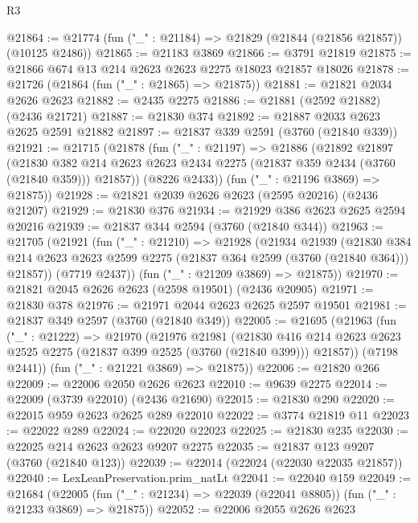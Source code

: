 \begin{lexlean}{R3}
\begin{coremodule}
@21864 := @21774 (fun ("_" : @21184) => @21829 (@21844 (@21856 @21857)) (@10125 @2486))
@21865 := @21183 @3869
@21866 := @3791 @21819
@21875 := @21866 @674 @13 @214 @2623 @2623 @2275 @18023 @21857 @18026
@21878 := @21726 (@21864 (fun ("_" : @21865) => @21875))
@21881 := @21821 @2034 @2626 @2623
@21882 := @2435 @2275
@21886 := @21881 (@2592 @21882) (@2436 @21721)
@21887 := @21830 @374
@21892 := @21887 @2033 @2623 @2625 @2591 @21882
@21897 := @21837 @339 @2591 (@3760 (@21840 @339))
@21921 := @21715
    (@21878
      (fun ("_" : @21197) =>
      @21886
        (@21892
          @21897
          (@21830
            @382
            @214
            @2623
            @2623
            @2434
            @2275
            (@21837 @359 @2434 (@3760 (@21840 @359)))
            @21857))
        (@8226 @2433))
      (fun ("_" : @21196 @3869) => @21875))
@21928 := @21821 @2039 @2626 @2623 (@2595 @20216) (@2436 @21207)
@21929 := @21830 @376
@21934 := @21929 @386 @2623 @2625 @2594 @20216
@21939 := @21837 @344 @2594 (@3760 (@21840 @344))
@21963 := @21705
    (@21921
      (fun ("_" : @21210) =>
      @21928
        (@21934
          @21939
          (@21830
            @384
            @214
            @2623
            @2623
            @2599
            @2275
            (@21837 @364 @2599 (@3760 (@21840 @364)))
            @21857))
        (@7719 @2437))
      (fun ("_" : @21209 @3869) => @21875))
@21970 := @21821 @2045 @2626 @2623 (@2598 @19501) (@2436 @20905)
@21971 := @21830 @378
@21976 := @21971 @2044 @2623 @2625 @2597 @19501
@21981 := @21837 @349 @2597 (@3760 (@21840 @349))
@22005 := @21695
    (@21963
      (fun ("_" : @21222) =>
      @21970
        (@21976
          @21981
          (@21830
            @416
            @214
            @2623
            @2623
            @2525
            @2275
            (@21837 @399 @2525 (@3760 (@21840 @399)))
            @21857))
        (@7198 @2441))
      (fun ("_" : @21221 @3869) => @21875))
@22006 := @21820 @266
@22009 := @22006 @2050 @2626 @2623
@22010 := @9639 @2275
@22014 := @22009 (@3739 @22010) (@2436 @21690)
@22015 := @21830 @290
@22020 := @22015 @959 @2623 @2625 @289 @22010
@22022 := @3774 @21819 @11
@22023 := @22022 @289
@22024 := @22020 @22023
@22025 := @21830 @235
@22030 := @22025 @214 @2623 @2623 @9207 @2275
@22035 := @21837 @123 @9207 (@3760 (@21840 @123))
@22039 := @22014 (@22024 (@22030 @22035 @21857))
@22040 := LexLeanPreservation.prim_natLt
@22041 := @22040 @159
@22049 := @21684
    (@22005 (fun ("_" : @21234) => @22039 (@22041 @8805)) (fun ("_" : @21233 @3869) => @21875))
@22052 := @22006 @2055 @2626 @2623

\end{coremodule}
\end{lexlean}
